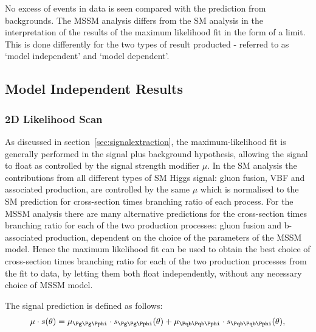 No excess of events in data is seen compared with the prediction from
backgrounds. The \ac{MSSM} analysis differs from the \ac{SM} analysis in the
interpretation of the results of the maximum likelihood fit in the form of a limit. This
is done differently for the two types of result producted - referred to as `model 
independent' and `model dependent'. 

\subsection{Model Independent Results}
\label{sec:modelindependent}

\subsubsection{2D Likelihood Scan}

As discussed in section~\ref{sec:signalextraction}, the maximum-likelihood fit
is generally performed in the signal plus background hypothesis, allowing the
signal to float as controlled by the signal strength modifier $\mu$. In the
\ac{SM} analysis the contributions from all different types of \ac{SM} Higgs
signal: gluon fusion, \ac{VBF} and associated production, are controlled by the
same $\mu$ which is normalised to the \ac{SM} prediction for cross-section times
branching ratio of each process. For the \ac{MSSM}
analysis there are many alternative predictions for the cross-section times
branching ratio for each of the two production processes: gluon fusion and
b-associated production, dependent on the choice of the parameters of the
\ac{MSSM} model. Hence the maximum likelihood fit can be used to obtain the best
choice of cross-section times branching ratio for each of the two production
processes from the fit to data, by letting them both float independently,
without any necessary choice of \ac{MSSM} model.

The signal prediction is defined as follows:
\begin{equation}
\mu \cdot s(\theta) = \mu_{\Pg\Pg\Pphi} \cdot s_{\Pg\Pg\Pphi}(\theta) + \mu_{\Pqb\Pqb\Pphi}
\cdot s_{\Pqb\Pqb\Pphi}(\theta) ,
\end{equation}

